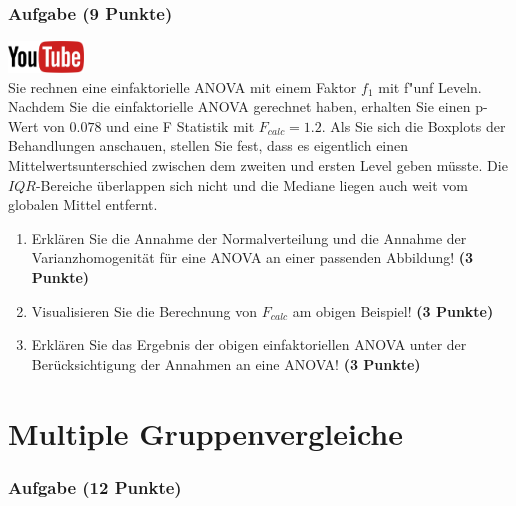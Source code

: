 \documentclass[a4paper, 9pt]{scrartcl}\usepackage[]{graphicx}\usepackage[]{xcolor}
\begin{document}
 
\clearpage

\section{Aufgabe \hfill (9 Punkte)}

\hfill\href{https://youtu.be/M9Uhm67ndxM}{\includegraphics[width =
  2cm]{img/youtube}}\\[1Ex]




Sie rechnen eine einfaktorielle ANOVA mit einem Faktor $f_1$ mit
f{"u}nf Leveln. Nachdem Sie die einfaktorielle ANOVA gerechnet
haben, erhalten Sie einen p-Wert von $0.078$ und eine F Statistik mit
$F_{calc} = 1.2$. Als Sie sich die Boxplots der Behandlungen anschauen,
stellen Sie fest, dass es eigentlich einen Mittelwertsunterschied zwischen
dem zweiten und ersten Level geben m{\"u}sste. Die
$IQR$-Bereiche {\"u}berlappen sich nicht und die Mediane liegen auch weit vom
globalen Mittel entfernt.


\begin{enumerate}
\item Erkl{\"a}ren Sie die Annahme der Normalverteilung und die Annahme der
  Varianzhomogenit{\"a}t f{\"u}r eine ANOVA an einer passenden Abbildung! \textbf{(3 Punkte)}
\item Visualisieren Sie die Berechnung von $F_{calc}$ am obigen Beispiel!
  \textbf{(3 Punkte)}
\item Erkl{\"a}ren Sie das Ergebnis der obigen einfaktoriellen ANOVA unter der
  Ber{\"u}cksichtigung der Annahmen an eine ANOVA! \textbf{(3 Punkte)}
\end{enumerate}

 
\clearpage
\part{Multiple Gruppenvergleiche}

\section{Aufgabe \hfill (12 Punkte)}
\end{document}
